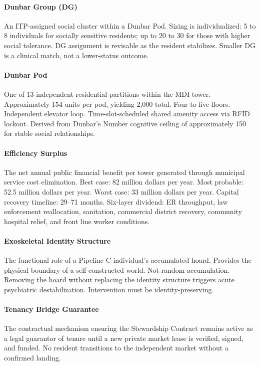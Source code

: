 {\paragraph{Dunbar Group (DG)} An ITP-assigned social cluster within a Dunbar Pod. Sizing is individualized: 5 to 8 individuals for socially sensitive residents; up to 20 to 30 for those with higher social tolerance. DG assignment is revisable as the resident stabilizes. Smaller DG is a clinical match, not a lower-status outcome.

\paragraph{Dunbar Pod} One of 13 independent residential partitions within the MDI tower. Approximately 154 units per pod, yielding 2,000 total. Four to five floors. Independent elevator loop. Time-slot-scheduled shared amenity access via RFID lockout. Derived from Dunbar's Number cognitive ceiling of approximately 150 for stable social relationships.

\paragraph{Efficiency Surplus} The net annual public financial benefit per tower generated through municipal service cost elimination. Best case: 82 million dollars per year. Most probable: 52.5 million dollars per year. Worst case: 33 million dollars per year. Capital recovery timeline: 29--71 months. Six-layer dividend: ER throughput, law enforcement reallocation, sanitation, commercial district recovery, community hospital relief, and front line worker conditions.

\paragraph{Exoskeletal Identity Structure} The functional role of a Pipeline C individual's accumulated hoard. Provides the physical boundary of a self-constructed world. Not random accumulation. Removing the hoard without replacing the identity structure triggers acute psychiatric destabilization. Intervention must be identity-preserving.

\paragraph{Tenancy Bridge Guarantee} The contractual mechanism ensuring the Stewardship Contract remains active as a legal guarantor of tenure until a new private market lease is verified, signed, and funded. No resident transitions to the independent market without a confirmed landing.

}
